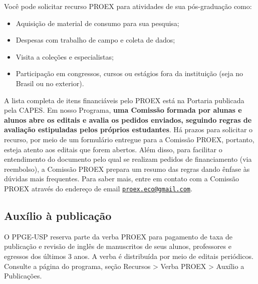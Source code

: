 \documentclass[twoside a4paper 12pt]{report}
\begin{document}
Você pode solicitar recurso PROEX para atividades de sua pós-graduação como:

\begin{itemize}
\item Aquisição de material de consumo para sua pesquisa;
\item Despesas com trabalho de campo e coleta de dados;
\item Visita a coleções e especialistas;
\item Participação em congressos, cursos ou estágios fora da
  instituição (seja no Brasil ou no exterior).
\end{itemize}

A lista completa de itens financiáveis pelo PROEX está na Portaria publicada pela CAPES. Em nosso Programa, \textbf{uma Comissão formada por alunas e alunos abre os editais e avalia os pedidos enviados, seguindo regras de avaliação estipuladas pelos próprios estudantes}. Há prazos para solicitar o recurso, por meio de um formulário entregue para a Comissão PROEX, portanto, esteja atento aos editais que forem abertos. Além disso, para facilitar o entendimento do documento pelo qual se realizam pedidos de financiamento (via reembolso), a Comissão PROEX prepara um resumo das regras dando ênfase às dúvidas mais frequentes. Para saber mais, entre em contato com a Comissão PROEX através do endereço de email \href{mailto:proex.eco@gmail.com}{\nolinkurl{proex.eco@gmail.com}}.

\subsection{Auxílio à publicação}

O PPGE-USP reserva parte da verba PROEX para pagamento de taxa de publicação e revisão de inglês de manuscritos de seus alunos, professores e egressos dos últimos 3 anos. A verba é distribuída por meio de editais periódicos. Consulte a página do programa, seção Recursos \textgreater{} Verba PROEX \textgreater{} Auxílio a Publicações.



\end{document}
